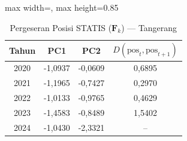 \begin{table}[H]
\centering
\caption{Pergeseran Posisi STATIS ($\mathbf{F}_k$) --- Tangerang} \label{tab:app1jarak_statis_skor_tangerang}
\begin{adjustbox}{max width=\textwidth, max height=0.85\textheight}
\begin{tabular}{|c|c|c|c|}
\hline
\textbf{Tahun} & \textbf{PC1} & \textbf{PC2} & \textbf{$D(\text{pos}_t, \text{pos}_{t+1})$} \\
\hline
2020 & -1,0937 & -0,0609 & 0,6895 \\
2021 & -1,1965 & -0,7427 & 0,2970 \\
2022 & -1,0133 & -0,9765 & 0,4629 \\
2023 & -1,4583 & -0,8489 & 1,5402 \\
2024 & -1,0430 & -2,3321 & -- \\
\hline
\end{tabular}
\end{adjustbox}
\end{table}
